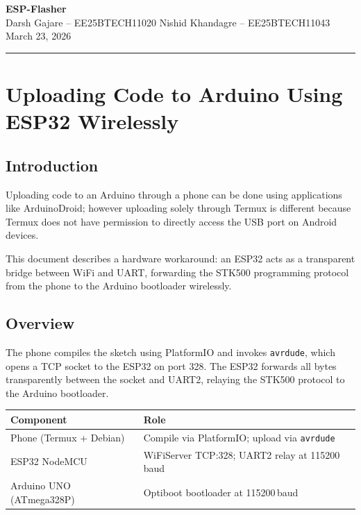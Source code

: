 \documentclass[11pt, a4paper]{article}
\begin{document}
\begin{center}
  {\LARGE\bfseries ESP-Flasher}\\[10pt]
  {\normalsize Darsh Gajare -- EE25BTECH11020
               \quad Nishid Khandagre -- EE25BTECH11043}\\[6pt]
  {\normalsize March 23, 2026}
\end{center}

\tableofcontents
\vspace{4pt}
\noindent\rule{\linewidth}{0.4pt}

\section{ Uploading Code to Arduino Using ESP32 Wirelessly}

\subsection{Introduction}

Uploading code to an Arduino through a phone can be done using applications like
ArduinoDroid; however uploading solely through Termux is different because Termux
does not have permission to directly access the USB port on Android devices.

This document describes a hardware workaround: an ESP32 acts as a transparent
bridge between WiFi and UART, forwarding the STK500 programming protocol from
the phone to the Arduino bootloader wirelessly.

\subsection{Overview}

The phone compiles the sketch using PlatformIO and invokes \texttt{avrdude},
which opens a TCP socket to the ESP32 on port 328. The ESP32 forwards all bytes
transparently between the socket and UART2, relaying the STK500 protocol to the
Arduino bootloader.

\begin{center}
\begin{tabular}{@{} l l @{}}
\toprule
\textbf{Component} & \textbf{Role} \\
\midrule
Phone (Termux + Debian)  & Compile via PlatformIO; upload via \texttt{avrdude} \\
ESP32 NodeMCU            & WiFiServer TCP:328; UART2 relay at 115200\,baud \\
Arduino UNO (ATmega328P) & Optiboot bootloader at 115200\,baud \\
\bottomrule
\end{tabular}
\end{center}
\end{document}
